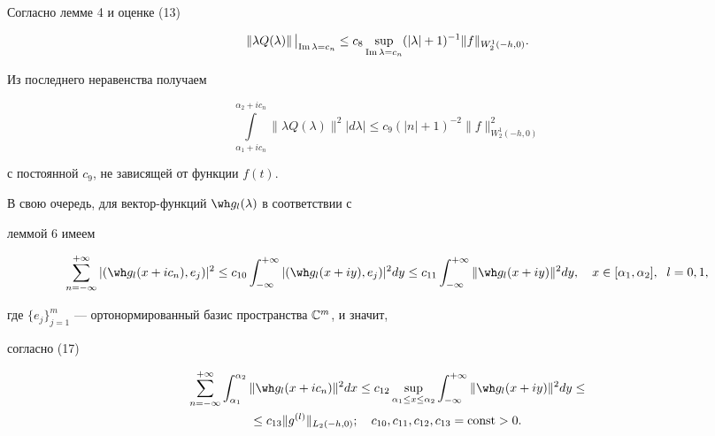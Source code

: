 Согласно лемме 4 и оценке (13) 


$$ 


\|\lambda Q(\lambda)\|\,\big|_{\im\lambda=c_n} 


\le c_8\sup_{\im\lambda=c_n}(|\lambda|+1)^{-1} 


\|f\|_{W^1_2(-h,0)}. 


$$ 


Из последнего неравенства получаем 


\begin{equation} 


\int\limits^{\alpha_2+i c_n}_{\alpha_1+i c_n} 


\|\lambda Q(\lambda)\|^2|d\lambda|\le c_9 


(|n|+1)^{-2}\|f\|^2_{W^1_2(-h,0)} 


\end{equation} 


с постоянной $c_9$, не зависящей от функции $f(t)$. 


 


В свою очередь, для вектор-функций $\wh g_l(\lambda)$ в соответствии с 


леммой 6 имеем 


$$ 


\sum^{+\infty}_{n=-\infty}|(\wh g_l(x+i c_n),e_j)|^2\le 


c_{10}\int^{+\infty}_{-\infty}|(\wh g_l(x+i y),e_j)|^2dy\le 


c_{11}\int^{+\infty}_{-\infty}\|\wh g_l(x+i y)\|^2dy,\quad 


x\in [\alpha_1,\alpha_2],\ \; l=0,1, 


$$ 


где $\{e_j\}^m_{j=1}$ --- ортонормированный базис пространства $\Bbb 


C^m$, и значит,


согласно (17) 


\begin{multline} 


\sum^{+\infty}_{n=-\infty}\int^{\alpha_2}_{\alpha_1} 


\|\wh g_l(x+i c_n)\|^2dx\le c_{12}\sup_{\alpha_1\le x\le\alpha_2} 


\int^{+\infty}_{-\infty}\|\wh g_l(x+i y)\|^2dy\le \\


%


\le c_{13}\|g^{(l)}\|_{L_2(-h,0)};\quad 


c_{10},c_{11},c_{12},c_{13}=\const>0. 


\end{multline} 


